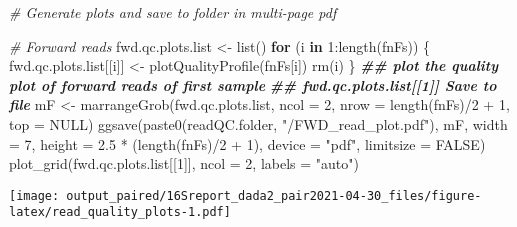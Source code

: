 \documentclass[
]{article}
\newenvironment{Shaded}{\begin{snugshade}}{\end{snugshade}}
\newcommand{\AttributeTok}[1]{\textcolor[rgb]{0.77,0.63,0.00}{#1}}
\newcommand{\CommentTok}[1]{\textcolor[rgb]{0.56,0.35,0.01}{\textit{#1}}}
\newcommand{\ConstantTok}[1]{\textcolor[rgb]{0.00,0.00,0.00}{#1}}
\newcommand{\ControlFlowTok}[1]{\textcolor[rgb]{0.13,0.29,0.53}{\textbf{#1}}}
\newcommand{\DecValTok}[1]{\textcolor[rgb]{0.00,0.00,0.81}{#1}}
\newcommand{\DocumentationTok}[1]{\textcolor[rgb]{0.56,0.35,0.01}{\textbf{\textit{#1}}}}
\newcommand{\FloatTok}[1]{\textcolor[rgb]{0.00,0.00,0.81}{#1}}
\newcommand{\FunctionTok}[1]{\textcolor[rgb]{0.00,0.00,0.00}{#1}}
\newcommand{\NormalTok}[1]{#1}
\newcommand{\OtherTok}[1]{\textcolor[rgb]{0.56,0.35,0.01}{#1}}
\newcommand{\SpecialCharTok}[1]{\textcolor[rgb]{0.00,0.00,0.00}{#1}}
\newcommand{\StringTok}[1]{\textcolor[rgb]{0.31,0.60,0.02}{#1}}
\begin{document}
\begin{Shaded}
\begin{Highlighting}[]
\CommentTok{\# Generate plots and save to folder in multi{-}page pdf}

\CommentTok{\# Forward reads}
\NormalTok{fwd.qc.plots.list }\OtherTok{\textless{}{-}} \FunctionTok{list}\NormalTok{()}
\ControlFlowTok{for}\NormalTok{ (i }\ControlFlowTok{in} \DecValTok{1}\SpecialCharTok{:}\FunctionTok{length}\NormalTok{(fnFs)) \{}
\NormalTok{    fwd.qc.plots.list[[i]] }\OtherTok{\textless{}{-}} \FunctionTok{plotQualityProfile}\NormalTok{(fnFs[i])}
    \FunctionTok{rm}\NormalTok{(i)}
\NormalTok{\}}
\DocumentationTok{\#\# plot the quality plot of forward reads of first sample}
\DocumentationTok{\#\# fwd.qc.plots.list[[1]] Save to file}
\NormalTok{mF }\OtherTok{\textless{}{-}} \FunctionTok{marrangeGrob}\NormalTok{(fwd.qc.plots.list, }\AttributeTok{ncol =} \DecValTok{2}\NormalTok{, }\AttributeTok{nrow =} \FunctionTok{length}\NormalTok{(fnFs)}\SpecialCharTok{/}\DecValTok{2} \SpecialCharTok{+} 
    \DecValTok{1}\NormalTok{, }\AttributeTok{top =} \ConstantTok{NULL}\NormalTok{)}
\FunctionTok{ggsave}\NormalTok{(}\FunctionTok{paste0}\NormalTok{(readQC.folder, }\StringTok{"/FWD\_read\_plot.pdf"}\NormalTok{), mF, }\AttributeTok{width =} \DecValTok{7}\NormalTok{, }
    \AttributeTok{height =} \FloatTok{2.5} \SpecialCharTok{*}\NormalTok{ (}\FunctionTok{length}\NormalTok{(fnFs)}\SpecialCharTok{/}\DecValTok{2} \SpecialCharTok{+} \DecValTok{1}\NormalTok{), }\AttributeTok{device =} \StringTok{"pdf"}\NormalTok{, }\AttributeTok{limitsize =} \ConstantTok{FALSE}\NormalTok{)}
\FunctionTok{plot\_grid}\NormalTok{(fwd.qc.plots.list[[}\DecValTok{1}\NormalTok{]], }\AttributeTok{ncol =} \DecValTok{2}\NormalTok{, }\AttributeTok{labels =} \StringTok{"auto"}\NormalTok{)}
\end{Highlighting}
\end{Shaded}

\texttt{[image: output\_paired/16Sreport\_dada2\_pair2021-04-30\_files/figure-latex/read\_quality\_plots-1.pdf]}
\end{document}
